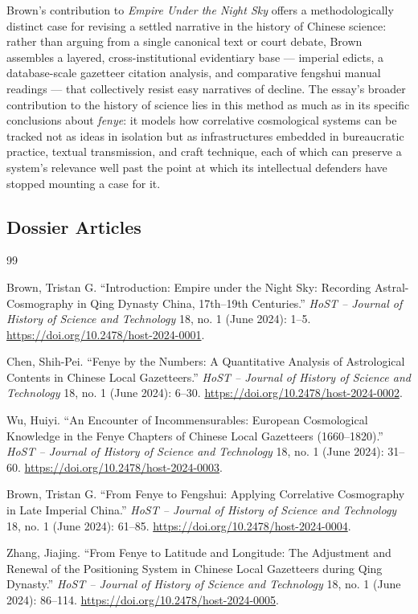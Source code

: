 \documentclass[10pt]{article}
\begin{document}
Brown's contribution to \emph{Empire Under the Night Sky} offers a methodologically distinct case for revising a settled narrative in the history of Chinese science: rather than arguing from a single canonical text or court debate, Brown assembles a layered, cross-institutional evidentiary base --- imperial edicts, a database-scale gazetteer citation analysis, and comparative fengshui manual readings --- that collectively resist easy narratives of decline. The essay's broader contribution to the history of science lies in this method as much as in its specific conclusions about \emph{fenye}: it models how correlative cosmological systems can be tracked not as ideas in isolation but as infrastructures embedded in bureaucratic practice, textual transmission, and craft technique, each of which can preserve a system's relevance well past the point at which its intellectual defenders have stopped mounting a case for it.

\subsection*{Dossier Articles}

\renewcommand{\refname}{}
\begin{thebibliography}{99}
\setlength{\itemsep}{0.6em}

 Brown, Tristan G. ``Introduction: Empire under the Night Sky: Recording Astral-Cosmography in Qing Dynasty China, 17th--19th Centuries.'' \emph{HoST -- Journal of History of Science and Technology} 18, no. 1 (June 2024): 1--5. \url{https://doi.org/10.2478/host-2024-0001}.

 Chen, Shih-Pei. ``Fenye by the Numbers: A Quantitative Analysis of Astrological Contents in Chinese Local Gazetteers.'' \emph{HoST -- Journal of History of Science and Technology} 18, no. 1 (June 2024): 6--30. \url{https://doi.org/10.2478/host-2024-0002}.

 Wu, Huiyi. ``An Encounter of Incommensurables: European Cosmological Knowledge in the Fenye Chapters of Chinese Local Gazetteers (1660--1820).'' \emph{HoST -- Journal of History of Science and Technology} 18, no. 1 (June 2024): 31--60. \url{https://doi.org/10.2478/host-2024-0003}.

 Brown, Tristan G. ``From Fenye to Fengshui: Applying Correlative Cosmography in Late Imperial China.'' \emph{HoST -- Journal of History of Science and Technology} 18, no. 1 (June 2024): 61--85. \url{https://doi.org/10.2478/host-2024-0004}.

 Zhang, Jiajing. ``From Fenye to Latitude and Longitude: The Adjustment and Renewal of the Positioning System in Chinese Local Gazetteers during Qing Dynasty.'' \emph{HoST -- Journal of History of Science and Technology} 18, no. 1 (June 2024): 86--114. \url{https://doi.org/10.2478/host-2024-0005}.

\end{thebibliography}
\end{document}
